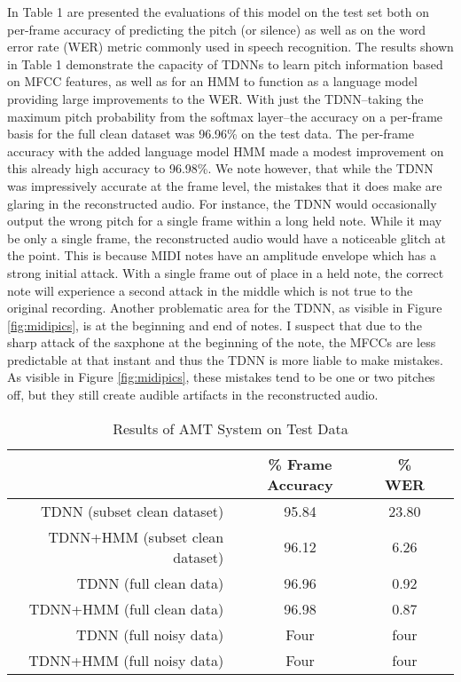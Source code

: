 \documentclass[conference]{IEEEtran}
\begin{document}
In Table 1 are presented the evaluations of this model on the test set both on per-frame accuracy of predicting the pitch (or silence) as well as on the word error rate (WER) metric commonly used in speech recognition. The results shown in Table 1 demonstrate the capacity of TDNNs to learn pitch information based on MFCC features, as well as for an HMM to function as a language model providing large improvements to the WER. With just the TDNN--taking the maximum pitch probability from the softmax layer--the accuracy on a per-frame basis for the full clean dataset was 96.96\% on the test data. The per-frame accuracy with the added language model HMM made a modest improvement on this already high accuracy to 96.98\%. We note however, that while the TDNN was impressively accurate at the frame level, the mistakes that it does make are glaring in the reconstructed audio. For instance, the TDNN would occasionally output the wrong pitch for a single frame within a long held note. While it may be only a single frame, the reconstructed audio would have a noticeable glitch at the point. This is because MIDI notes have an amplitude envelope which has a strong initial attack. With a single frame out of place in a held note, the correct note will experience a second attack in the middle which is not true to the original recording. Another problematic area for the TDNN, as visible in Figure \ref{fig:midipics}, is at the beginning and end of notes. I suspect that due to the sharp attack of the saxphone at the beginning of the note, the MFCCs are less predictable at that instant and thus the TDNN is more liable to make mistakes. As visible in Figure \ref{fig:midipics}, these mistakes tend to be one or two pitches off, but they still create audible artifacts in the reconstructed audio.

\begin{table}[H]
\renewcommand{\arraystretch}{1.3}
\caption{Results of AMT System on Test Data}
\label{table_example}
\centering
\begin{tabular}{|r|c|c|c|}
\hline
 & \% Frame Accuracy & \% WER \\
\hline
TDNN (subset clean dataset) & 95.84 & 23.80 \\
\hline
TDNN+HMM (subset clean dataset) & 96.12 & 6.26 \\
\hline
TDNN (full clean data) & 96.96 & 0.92 \\
\hline
TDNN+HMM (full clean data) &  96.98 & 0.87 \\
\hline
TDNN (full noisy data) & Four & four \\
\hline
TDNN+HMM (full noisy data) & Four & four \\
\hline
\end{tabular}
\end{table}
\end{document}
